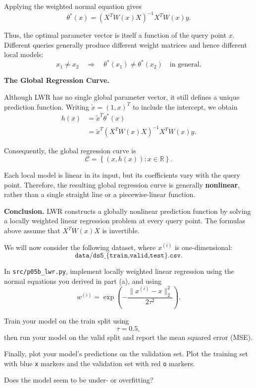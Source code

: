 \documentclass[10pt]{article}
\begin{document}
\begin{enumerate}
\begin{enumerate}[label=(\alph*)]
Applying the weighted normal equation gives
\[
\boxed{
\theta^*(x)
=
\left(X^TW(x)X\right)^{-1}X^TW(x)y.
}
\]

Thus, the optimal parameter vector is itself a function of
the query point $x$. Different queries generally produce
different weight matrices and hence different local models:
\[
x_1\neq x_2
\quad\Longrightarrow\quad
\theta^*(x_1)\neq\theta^*(x_2)
\quad\text{in general}.
\]

\noindent\textbf{The Global Regression Curve.}

Although LWR has no single global parameter vector, it
still defines a unique prediction function. Writing
$\tilde{x}=(1,x)^T$ to include the intercept, we obtain
\[
\begin{aligned}
h(x)
&=\tilde{x}^T\theta^*(x)\\
&=\boxed{
\tilde{x}^T
\left(X^TW(x)X\right)^{-1}X^TW(x)y
}.
\end{aligned}
\]

Consequently, the global regression curve is
\[
\boxed{
\mathcal{C}
=
\left\{
(x,h(x)):x\in\mathbb{R}
\right\}.
}
\]

Each local model is linear in its input, but its coefficients
vary with the query point. Therefore, the resulting global
regression curve is generally \textbf{nonlinear}, rather than
a single straight line or a piecewise-linear function.

\medskip
\noindent
\textbf{Conclusion.}
LWR constructs a globally nonlinear prediction function
by solving a locally weighted linear regression problem
at every query point. The formulas above assume that
$X^TW(x)X$ is invertible.


\vspace{4mm}
We will now consider the following dataset, where $x^{(i)}$ is
one-dimensional:
\[
\texttt{data/ds5\_\{train,valid,test\}.csv}.
\]

In \texttt{src/p05b\_lwr.py}, implement locally weighted linear
regression using the normal equations you derived in part (a), and
using
\[
w^{(i)}
=
\exp\left(
-
\frac{
\|x^{(i)}-x\|_2^2
}{
2\tau^2
}
\right).
\]

Train your model on the train split using
\[
\tau=0.5,
\]
then run your model on the valid split and report the mean squared
error (MSE).

Finally, plot your model's predictions on the validation set. Plot the
training set with blue \texttt{x} markers and the validation set with
red \texttt{o} markers.

Does the model seem to be under- or overfitting?


\end{enumerate}
\end{enumerate}
\end{document}
